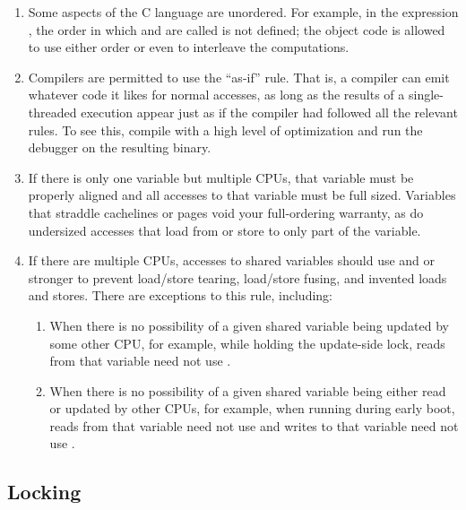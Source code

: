 \begin{enumerate}
\item	Some aspects of the C language are unordered.
	For example, in the expression , the order in
	which  and  are called is not defined; the object
	code is allowed to use either order or even to interleave the
	computations.

\item	Compilers are permitted to use the ``as-if'' rule.
	That is, a compiler can emit whatever code it likes for normal accesses,
	as long as the results of a single-threaded execution appear
	just as if the compiler had followed all the relevant rules.
	To see this, compile with a high level of optimization and run
	the debugger on the resulting binary.

\item	If there is only one variable but multiple CPUs, that variable
	must be properly aligned and all accesses to that variable must
	be full sized.
	Variables that straddle cachelines or pages void your full-ordering
	warranty, as do undersized accesses that load from or store to only
	part of the variable.

\item	If there are multiple CPUs, accesses to shared variables should
	use  and  or stronger to prevent
	load/store tearing, load/store fusing, and invented loads and stores.
	There are exceptions to this rule, including:

	\begin{enumerate}
	\item	When there is no possibility of a given shared variable
		being updated by some other CPU, for example, while
		holding the update-side lock, reads from that variable
		need not use .

	\item	When there is no possibility of a given shared variable
		being either read or updated by other CPUs, for example,
		when running during early boot, reads from that variable
		need not use  and writes to that variable
		need not use .
	\end{enumerate}
\end{enumerate}


\subsection{Locking}

